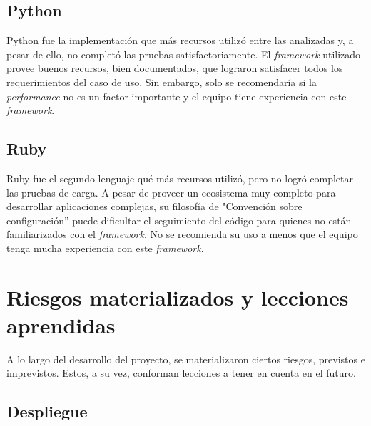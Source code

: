 \documentclass[11pt]{article}
\let\Oldsection\section
\renewcommand{\section}{\FloatBarrier\Oldsection}
\let\Oldsubsection\subsection
\renewcommand{\subsection}{\FloatBarrier\Oldsubsection}
\newcommand{\english}[1]{\textit{#1}}
\begin{document}
\subsection{Python}
Python fue la implementación que más recursos utilizó entre las analizadas y, a pesar de ello, no completó las pruebas satisfactoriamente. El \english{framework} utilizado provee buenos recursos, bien documentados, que lograron satisfacer todos los requerimientos del caso de uso. Sin embargo, solo se recomendaría si la \english{performance} no es un factor importante y el equipo tiene experiencia con este \english{framework}.

\subsection{Ruby}
Ruby fue el segundo lenguaje qué más recursos utilizó, pero no logró completar las pruebas de carga. A pesar de proveer un ecosistema muy completo para desarrollar aplicaciones complejas, su filosofía de "Convención sobre configuración'' puede dificultar el seguimiento del código para quienes no están familiarizados con el \textit{framework}. No se recomienda su uso a menos que el equipo tenga mucha experiencia con este \english{framework}.

\newpage

\section{Riesgos materializados y lecciones aprendidas}


A lo largo del desarrollo del proyecto, se materializaron ciertos riesgos, previstos e imprevistos. Estos, a su vez, conforman lecciones a tener en cuenta en el futuro.

\subsection{Despliegue}
\end{document}
